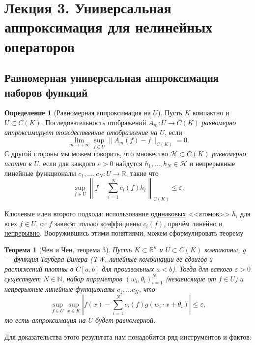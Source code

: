 \documentclass[a4paper, 12pt]{article}
\theoremstyle{definition}
\newtheorem*{definition}{Определение}
\theoremstyle{plain}
\newtheorem*{theorem}{Теорема}
\theoremstyle{remark}
\theoremstyle{remark}
\theoremstyle{remark}
\begin{document}
\section*{Лекция 3. Универсальная аппроксимация для нелинейных операторов}
\subsection*{Равномерная универсальная аппроксимация наборов функций}
\begin{definition}[Равномерная аппроксимация на $U$]
  Пусть $K$ компактно и $U \subset C(K)$.
  Последовательность отображений $A_m\colon U \to C(K)$ \emph{равномерно аппроксимирует тождественное отображение на $U$}, если
  $$\lim_{m \to +\infty} \sup_{f \in U}\|A_m(f) - f\|_{C(K)} = 0.$$
  С другой стороны мы можем говорить, что множество $\mathcal{H} \subset C(K)$ \emph{равномерно плотно в $U$}, если для каждого $\varepsilon > 0$ найдутся $h_1, \dots, h_N \in \mathcal{H}$ и непрерывные линейные функционалы $c_1, \dots, c_N\colon U \to \mathbb{R}$, такие что
  $$\sup_{f \in U}\left\|f - \sum_{i = 1}^{N}c_i(f)h_i\right\|_{C(K)} \le \varepsilon.$$
\end{definition}
Ключевые идеи второго подхода: использование \underline{одинаковых} <<атомов>> $h_i$ для всех $f \in U$, от $f$ зависят только коэффициены $c_i(f)$, причём \underline{линейно и непрерывно}.
Вооружившись этими понятиями, можем сформулировать теорему
\begin{theorem}[Чен и Чен, теорема 3]
  \label{thm:uat_compact}
  Пусть $K \subset \mathbb{R}^n$ и $U \subset C(K)$ компактны, $g$ --- функция Таубера-Винера (TW, линейные комбинации её сдвигов и растяжений плотны в $C[a, b]$ для произвольных $a < b$).
  Тогда для всякого $\varepsilon > 0$ существует $N \in \mathbb{N}$, набор параметров ${(w_i, \theta_i)}_{i=1}^N$ (независящие от $f \in U$) и непрерывные линейные функционалы $c_1, \dots c_N$, что
  $$\sup_{f \in U}\sup_{x \in K} \left|f(x) - \sum_{i = 1}^{N}c_i(f)g(w_i \cdot x + \theta_i)\right| \le \varepsilon,$$
  то есть аппроксимация на $U$ будет равномерной.
\end{theorem}
Для доказательства этого результата нам понадобится ряд инструментов и фактов:
\end{document}
